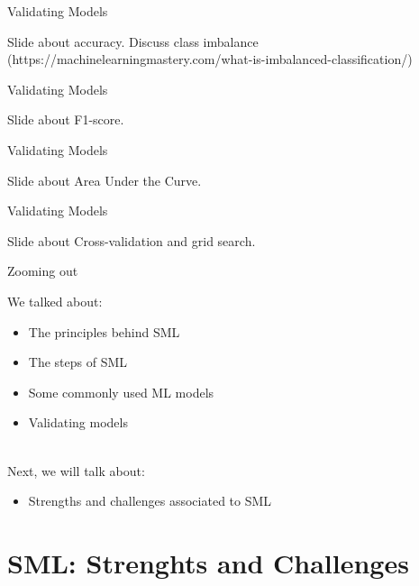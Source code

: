 \documentclass[handout]{beamer}
\begin{document}
\begin{frame}{Validating Models}
	
	Slide about accuracy. Discuss class imbalance (https://machinelearningmastery.com/what-is-imbalanced-classification/)
	
\end{frame}


\begin{frame}{Validating Models}
	
	Slide about F1-score.
	
\end{frame}


\begin{frame}{Validating Models}
	
	Slide about Area Under the Curve.
	
\end{frame}


\begin{frame}{Validating Models}
	
	Slide about Cross-validation and grid search.
	
\end{frame}



\begin{frame}{Zooming out} 
	
	We talked about:
	\begin{itemize}
		\item The principles behind SML
		\item The steps of SML
		\item Some commonly used ML models
		\item Validating models \\\
	\end{itemize}
	
	Next, we will talk about:
	\begin{itemize}
		\item Strengths and challenges associated to SML
	\end{itemize}
	
\end{frame}


\section{SML: Strenghts and Challenges}
\end{document}
